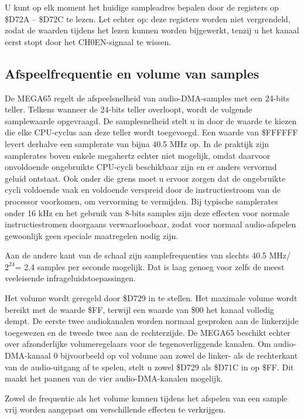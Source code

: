 U kunt op elk moment het huidige sampleadres bepalen door de registers op \$D72A -- \$D72C te lezen. Let echter op: deze registers worden niet vergrendeld, zodat de waarden tijdens het lezen kunnen worden bijgewerkt, tenzij u het kanaal eerst stopt door het CH0EN-signaal te wissen.

\subsection{Afspeelfrequentie en volume van samples}

De MEGA65 regelt de afspeelsnelheid van audio-DMA-samples met een 24-bits teller. Telkens wanneer de 24-bits teller overloopt, wordt de volgende samplewaarde opgevraagd. De samplesnelheid stelt u in door de waarde te kiezen die elke CPU-cyclus aan deze teller wordt toegevoegd. Een waarde van \$FFFFFF levert derhalve een samplerate van bijna 40.5 MHz op. In de praktijk zijn samplerates boven enkele megahertz echter niet mogelijk, omdat daarvoor onvoldoende ongebruikte CPU-cycli beschikbaar zijn en er anders vervormd geluid ontstaat. Ook onder die grens moet u ervoor zorgen dat de ongebruikte cycli voldoende vaak en voldoende verspreid door de instructiestroom van de processor voorkomen, om vervorming te vermijden. Bij typische samplerates onder 16 kHz en het gebruik van 8-bits samples zijn deze effecten voor normale instructiestromen doorgaans verwaarloosbaar, zodat voor normaal audio-afspelen gewoonlijk geen speciale maatregelen nodig zijn.

Aan de andere kant van de schaal zijn samplefrequenties van slechts 40.5 MHz/$2^{24}$= 2.4 samples per seconde mogelijk. Dat is laag genoeg voor zelfs de meest veeleisende infrageluidstoepassingen.

Het volume wordt geregeld door \$D729 in te stellen. Het maximale volume wordt bereikt met de waarde \$FF, terwijl een waarde van \$00 het kanaal volledig dempt. De eerste twee audiokanalen worden normaal gesproken aan de linkerzijde toegewezen en de tweede twee aan de rechterzijde. De MEGA65 beschikt echter over afzonderlijke volumeregelaars voor de tegenoverliggende kanalen. Om audio-DMA-kanaal 0 bijvoorbeeld op vol volume aan zowel de linker- als de rechterkant van de audio-uitgang af te spelen, stelt u zowel \$D729 als \$D71C in op \$FF. Dit maakt het pannen van de vier audio-DMA-kanalen mogelijk.

Zowel de frequentie als het volume kunnen tijdens het afspelen van een sample vrij worden aangepast om verschillende effecten te verkrijgen.

